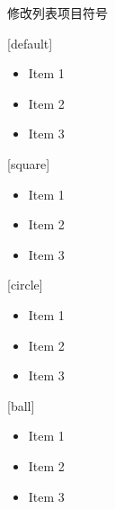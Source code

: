 \documentclass{ctexbeamer}
\begin{document}
\begin{frame}{修改列表项目符号}

[default] 
\begin{itemize}
  \item Item 1
  \item Item 2
  \item Item 3
\end{itemize}

[square] 
\begin{itemize}
  \item Item 1
  \item Item 2
  \item Item 3
\end{itemize}

[circle] 
\begin{itemize}
  \item Item 1
  \item Item 2
  \item Item 3
\end{itemize}

[ball] 
\begin{itemize}
  \item Item 1
  \item Item 2
  \item Item 3
\end{itemize}

\end{frame}
\end{document}
